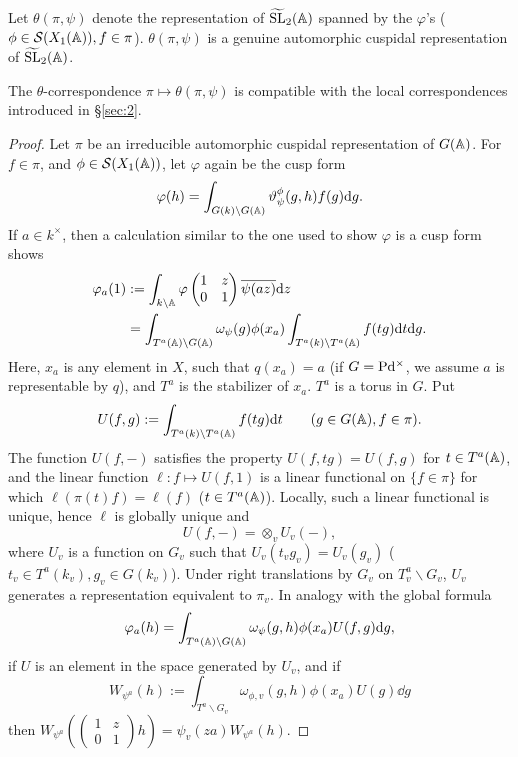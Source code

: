 Let $\theta(\pi, \psi)$ denote the representation of $\widetilde{\mathrm{SL}}_2(\mathbb{A})$ spanned by the $\varphi$'s ($\phi \in \mathcal{S}(X_1(\mathbb{A})), f \in \pi$).
$\theta(\pi, \psi)$ is a genuine automorphic cuspidal representation of $\widetilde{\mathrm{SL}}_2(\mathbb{A})$.

\begin{theorem}
\label{thm:3.1}
The $\theta$-correspondence $\pi \mapsto \theta(\pi, \psi)$ is compatible with the local correspondences introduced in \S \ref{sec:2}.
\end{theorem}

\begin{proof}
Let $\pi$ be an irreducible automorphic cuspidal representation of $G(\mathbb{A})$. For $f \in \pi$, and $\phi \in \mathcal{S}(X_1(\mathbb{A}))$, let $\varphi$ again be the cusp form
\[
\varphi(h) = \int_{G(k) \backslash G(\mathbb{A})} \vartheta_{\psi}^\phi(g, h) f(g) \mathrm{d} g.
\]
If $a \in k^\times$, then a calculation similar to the one used to show $\varphi$ is a cusp form shows
\begin{align}
    \varphi_a(1) &:= \int_{k \backslash \mathbb{A}} \varphi \begin{pmatrix}
        1 & z \\ 0& 1
    \end{pmatrix} \overline{\psi(az)} \mathrm{d} z \nonumber \\ 
    &= \int_{T^a(\mathbb{A}) \backslash G(\mathbb{A})} \omega_\psi(g) \phi(x_a) \int_{T^a(k) \backslash T^a(\mathbb{A})} f(tg) \mathrm{d} t \mathrm{d} g. \label{eqn:F}
\end{align}
Here, $x_a$ is any element in $X$, such that $q(x_a) = a$ (if $G = \mathrm{P} \mathrm{d}^\times$, we assume $a$ is representable by $q$), and $T^a$ is the stabilizer of $x_a$.
$T^a$ is a torus in $G$.
Put
\[
U(f, g) := \int_{T^a(k) \backslash T^a(\mathbb{A})} f(tg) \mathrm{d} t\qquad (g \in G(\mathbb{A}), f \in \pi).
\]
The function $U(f, -)$ satisfies the property $U(f, tg) = U(f, g)$ for $t \in T^a(\mathbb{A})$, and the linear function $\ell: f \mapsto U(f, 1)$ is a linear functional on $\{f\in \pi\}$ for which $\ell(\pi(t)f) = \ell(f)$ ($t \in T^a(\mathbb{A})$).
Locally, such a linear functional is unique, hence $\ell$ is globally unique and
\[
U(f, -) = \otimes_v U_v(-),
\]
where $U_v$ is a function on $G_v$ such that $U_v(t_v g_v) = U_v(g_v)$ ($t_v \in T^a(k_v), g_v \in G(k_v)$).
Under right translations by $G_v$ on $T^a_v \backslash G_v$, $U_v$ generates a representation equivalent to $\pi_v$. In analogy with the global formula
\[
\varphi_a(h) = \int_{T^a(\mathbb{A}) \backslash G(\mathbb{A})} \omega_\psi(g, h) \phi(x_a) U(f, g) \mathrm{d} g,
\]
if $U$ is an element in the space generated by $U_v$, and if
\[
W_{\psi^a}(h) := \int_{T^a \backslash G_v} \omega_{\phi, v}(g, h) \phi(x_a) U(g) \dd g
\]
then $W_{\psi^a}\left(\left(\begin{smallmatrix}
    1 & z \\ 0 & 1
\end{smallmatrix}\right)h\right) = \psi_v(za) W_{\psi^a}(h)$.
\end{proof}

